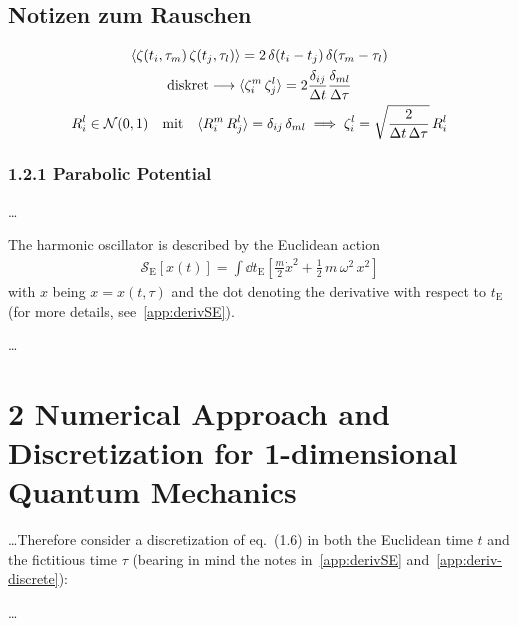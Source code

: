 \documentclass[11pt,a4paper]{scrartcl}
\newcommand{\action}{\ensuremath{\mathcal{S}}}
\begin{document}
\subsection*{Notizen zum Rauschen}
\begin{gather*}
    \langle\zeta(t_i,\tau_m)\,\zeta(t_j,\tau_l)\rangle=2\,\delta(t_i-t_j)\,\delta(\tau_m-\tau_l)
    \\
    \text{diskret}\longrightarrow\langle\zeta_i^m\,\zeta_j^l\rangle=2\frac{\delta_{ij}}{\Delta{t}}\frac{\delta_{ml}}{\Delta{\tau}}
    \\
    R_i^l\in\mathcal{N}(0,1)\qq{mit}\langle{R_i^m\,R_j^l}\rangle=\delta_{ij}\,\delta_{ml}
    \implies \zeta_i^l=\sqrt{\frac{2}{\Delta{t}\,\Delta{\tau}}}\,R_i^l
\end{gather*}


\newpage


\subsubsection*{1.2.1 Parabolic Potential}
\dots

The harmonic oscillator is described by the Euclidean action
\begin{align}
    \action_\mathrm{E}\left[x(t)\right] =
    \int\dd{t_\mathrm{E}}\left[\frac{m}{2}\dot{x}^2 +
        \frac{1}{2}\,m\,\omega^2\,x^2\right]
\end{align}
with $x$ being $x = x(t, \tau )$ and the dot denoting the derivative with
respect to $t_\mathrm{E}$ (for more details, see~\ref{app:derivSE}).

\dots


\section*{2 Numerical Approach and Discretization for 1-dimensional Quantum
Mechanics}
\dots Therefore consider a discretization of eq.~(1.6) in
both the Euclidean time $t$ and the fictitious time $\tau$ (bearing in mind the
notes in~\ref{app:derivSE} and~\ref{app:deriv-discrete}):

\dots
\end{document}
